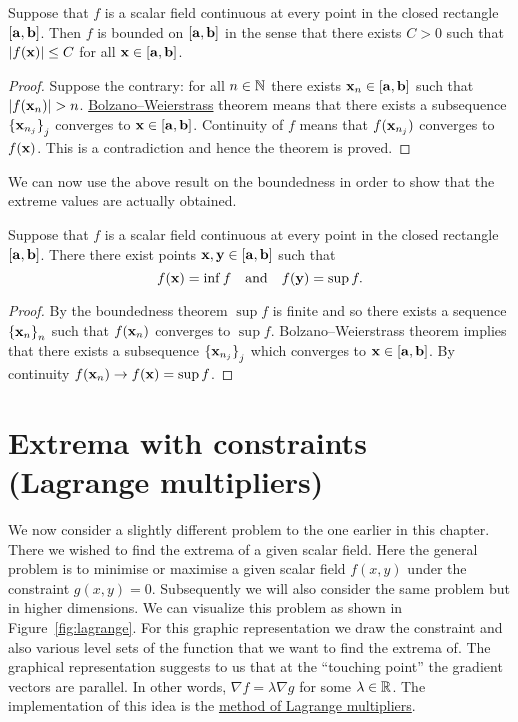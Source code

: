 \begin{theorem}
    Suppose that \(f\) is a scalar field continuous at every point in the closed rectangle \([\mathbf{a},\mathbf{b}]\).
    Then \(f\) is bounded on \([\mathbf{a},\mathbf{b}]\) in the sense that there exists \(C>0\) such that \(\left|f(\mathbf{x})\right| \leq C\) for all \(\mathbf{x} \in [\mathbf{a},\mathbf{b}]\).
\end{theorem}

\begin{proof}
    Suppose the contrary: for all \(n\in\mathbb{N}\) there exists \(\mathbf{x}_n\in [\mathbf{a},\mathbf{b}]\) such that \(\abs{f(\xx_n)}>n\).
    \href{https://en.wikipedia.org/wiki/Bolzano%E2%80%93Weierstrass_theorem}{Bolzano–Weierstrass} theorem means that there exists a subsequence \({\{\mathbf{x}_{n_j}\}}_{j}\) converges to \( \mathbf{x} \in [\mathbf{a},\mathbf{b}]\).
    Continuity of \(f\) means that \(f(\mathbf{x}_{n_j})\) converges to \(f(\mathbf{x})\). This is a contradiction and hence the theorem is proved.
\end{proof}


We can now use the above result on the boundedness in order to show that the  extreme values are actually obtained.

\begin{theorem}
    Suppose that \(f\) is a scalar field continuous at every point in the closed rectangle \([\mathbf{a},\mathbf{b}]\).
    There there exist points \( \mathbf{x}, \mathbf{y} \in [\mathbf{a},\mathbf{b}]\) such that
    \[
        f(\mathbf{x}) = \inf f
        \quad \text{and} \quad
        f(\mathbf{y})= \sup f.
    \]
\end{theorem}

\begin{proof}
    By the boundedness theorem \(\sup f\) is finite and so there exists a sequence  \({\{\mathbf{x}_{n}\}}_{n}\)  such that \(f(\mathbf{x}_n)\) converges to \(\sup f\).
    Bolzano–Weierstrass theorem implies that there exists a subsequence  \({\{\mathbf{x}_{n_j}\}}_{j}\) which converges to \( \mathbf{x} \in [\mathbf{a},\mathbf{b}]\).
    By continuity \(f(\mathbf{x}_n) \to f(\mathbf{x}) = \sup f\).
\end{proof}




\section{Extrema with constraints (Lagrange multipliers)}

We now consider a slightly different problem to the one earlier in this chapter.
There we wished to find the extrema of a given scalar field.
Here the general problem is to minimise or maximise a given scalar field \(f(x,y)\) under the constraint \(g(x,y) = 0\).
Subsequently we will also consider the same problem but in higher dimensions.
We can visualize this problem as shown in Figure~\ref{fig:lagrange}.
For this graphic representation we draw the constraint and also various level sets of the function that we want to find the extrema of.
The graphical representation suggests to us that at the ``touching point'' the gradient vectors are parallel.
In other words, \(\nabla f = \lambda \nabla g\) for some \(\lambda \in \mathbb{R}\).
The implementation of this idea is the \href{https://en.wikipedia.org/wiki/Lagrange_multiplier}{method of Lagrange multipliers}.


